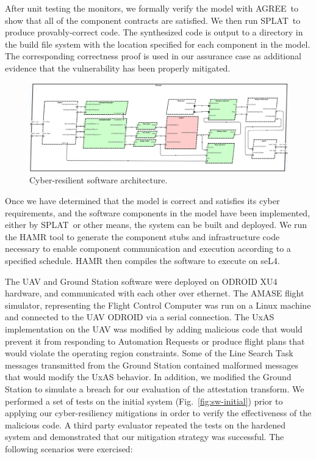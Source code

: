 \documentclass[global,twocolumn]{svjour}
\newcommand{\figref}[1]{Fig.~\ref{#1}}
\newcommand{\agr}{AGREE}
\newcommand{\splt}{SPLAT}
\begin{document}
After unit testing the monitors, we formally verify the model with \agr\ to show that all of the component contracts are satisfied.
%
We then run \splt\ to produce provably-correct code.
%
The synthesized code is output to a directory in the build file system with the location specified for each component in the model.
%
The corresponding correctness proof is used in our assurance case as additional evidence that the vulnerability has been properly mitigated.

\begin{figure}[h]
	\centering
	\includegraphics[width=2\columnwidth]{figs/hardened-sw.png}
	\caption{Cyber-resilient software architecture.}
	\label{fig:hardened-sw}
\end{figure}

Once we have determined that the model is correct and satisfies its cyber requirements, and the software components in the model have been implemented, either by \splt\ or other means, the system can be built and deployed.
%
We run the HAMR tool to generate the component stubs and infrastructure code necessary to enable component communication and execution according to a specified schedule.
%
HAMR then compiles the software to execute on seL4.

The UAV and Ground Station software were deployed on ODROID XU4 hardware, and communicated with each other over ethernet.
%
The AMASE flight simulator, representing the Flight Control Computer was run on a Linux machine and connected to the UAV ODROID via a serial connection.
%
The UxAS implementation on the UAV was modified by adding malicious code that would prevent it from responding to Automation Requests or produce flight plans that would violate the operating region constraints.
%
Some of the Line Search Task messages transmitted from the Ground Station contained malformed messages that would modify the UxAS behavior. In addition, we modified the Ground Station to simulate a breach for our evaluation of the attestation transform.
%
We performed a set of tests on the initial system (\figref{fig:sw-initial}) prior to applying our cyber-resiliency mitigations in order to verify the effectiveness of the malicious code.
A third party evaluator repeated the tests on the hardened system and demonstrated that our mitigation strategy was successful.
%
The following scenarios were exercised:
\end{document}
